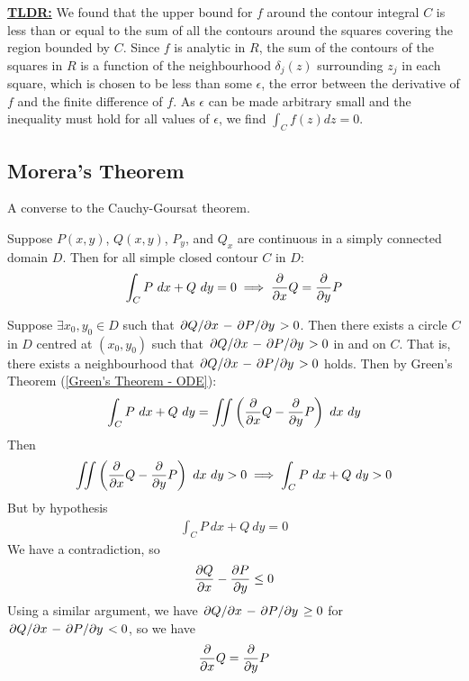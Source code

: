 \documentclass[12pt, english]{book}
\makeatletter
\renewenvironment{proof}[1][\proofname]{\par
	\pushQED{\qed}%
	\normalfont \topsep6\p@\@plus6\p@\relax
	\list{}{%
		\settowidth{\leftmargin}{\itshape\proofname:\hskip\labelsep}%
		\setlength{\labelwidth}{0pt}%
		\setlength{\itemindent}{-\leftmargin}%
		}%
	\item[\hskip\labelsep\itshape#1\@addpunct{:}]\ignorespaces
	}{\popQED\endlist\@endpefalse}
\makeatother
\begin{document}
\begin{proof}
		\underline{\textbf{TLDR:}} \newline 
		We found that the upper bound for \(f\) around the contour integral \(C\) is less than or equal to the sum of all the contours around the squares covering the region bounded by \(C\). Since \(f\) is analytic in \(R\), the sum of the contours of the squares in \(R\) is a function of the neighbourhood \(\delta_j (z)\) surrounding \(z_j\) in each square, which is chosen to be less than some \(\epsilon\), the error between the derivative of \(f\) and the finite difference of \(f\). 
		As \(\epsilon\) can be made arbitrary small and the inequality must hold for all values of \(\epsilon\), we find \(\int_{C} f(z) dz = 0\).
	\end{proof}

	\subsection{Morera's Theorem} \label{Morera's Theorem Subsection - Complex}
	
	A converse to the Cauchy-Goursat theorem. 
	
	\begin{lemma}
		Suppose \(P(x,y)\), \(Q(x,y)\), \(P_y\), and \(Q_x\) are continuous in a simply connected domain \(D\). Then for all simple closed contour \(C\) in \(D\):
		\begin{align*}
			\int_{C} P \ dx + Q \ dy = 0 \implies \pdv{x}Q = \pdv{y} P 
		\end{align*}
	\end{lemma}
	\begin{proof}
		Suppose \(\exists x_0, y_0 \in D\) such that \(\pdv*{Q}{x} - \pdv*{P}{y} > 0\). Then there exists a circle \(C\) in \(D\) centred at \((x_0, y_0)\) such that \(\pdv*{Q}{x} - \pdv*{P}{y} > 0\) in and on \(C\). That is, there exists a neighbourhood that \(\pdv*{Q}{x} - \pdv*{P}{y} > 0\) holds. Then by Green's Theorem (\cref{Green's Theorem - ODE}):
		\begin{align*}
			\int_{C} P \ dx + Q \ dy = \iint \left(\pdv{x}Q - \pdv{y}P\right) \ dx \ dy
		\end{align*}
		Then 
		\begin{align*}
			\iint \left(\pdv{x}Q - \pdv{y}P\right) \ dx \ dy > 0 
			\implies \int_{C} P \ dx + Q \ dy  > 0
		\end{align*}
		But by hypothesis
		\begin{align*}
			\int_{C} P \ dx + Q \ dy = 0 
		\end{align*}
		We have a contradiction, so 
		\begin{align*}
			\pdv{Q}{x} - \pdv{P}{y} \leq 0
		\end{align*}
		Using a similar argument, we have \(\pdv*{Q}{x} - \pdv*{P}{y} \geq 0\) for \(\pdv*{Q}{x} - \pdv*{P}{y} < 0\), so we have 
		\begin{align*}
			\pdv{x}Q = \pdv{y}P
		\end{align*}
	\end{proof}
\end{document}
